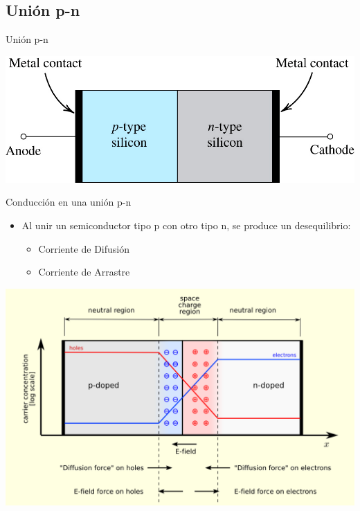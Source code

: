 \documentclass[xcolor={usenames,svgnames,dvipsnames}]{beamer}
\begin{document}
\subsection{Unión p-n}
\label{sec:org314113a}
\begin{frame}[label={sec:org79d6200}]{Unión p-n}
\begin{center}
\begin{center}
\includegraphics[width=.9\linewidth]{../figs/Union_PN.jpg}
\end{center}
\end{center}
\end{frame}


\begin{frame}[label={sec:org006e716}]{Conducción en una unión p-n}
\begin{itemize}
\item Al \alert{unir un semiconductor tipo p con otro tipo n, se produce un desequilibrio}:
\begin{itemize}
\item Corriente de Difusión
\item Corriente de Arrastre
\end{itemize}
\end{itemize}

\begin{center}
\begin{center}
\includegraphics[width=.9\linewidth]{../figs/Pn-junction-equilibrium.png}
\end{center}
\end{center}
\end{frame}
\end{document}
